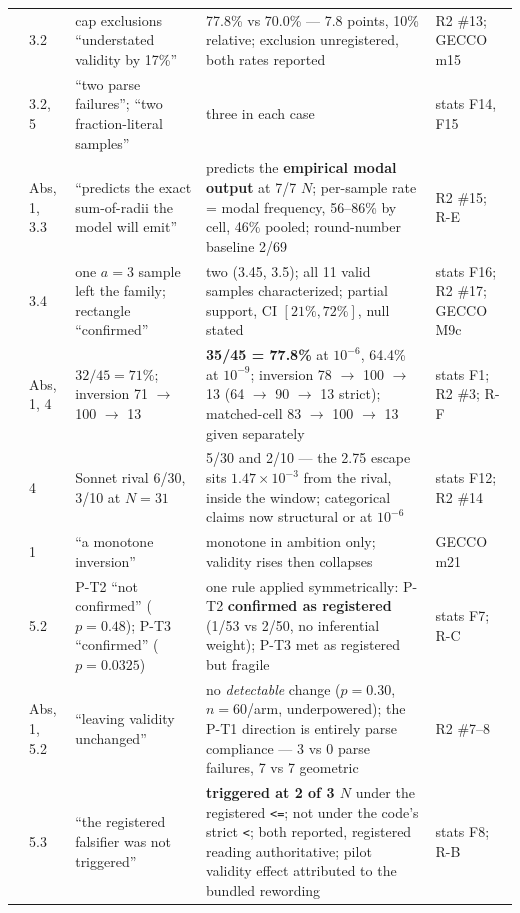 \documentclass[11pt]{article}
\begin{document}
\begin{longtable}{L{0.4cm}L{1.0cm}L{4.1cm}L{6.4cm}L{1.8cm}}
 & 3.2 & cap exclusions ``understated validity by 17\%'' & 77.8\% vs 70.0\% --- 7.8 points, 10\% relative; exclusion unregistered, both rates reported & R2 \#13; GECCO m15 \\
 & 3.2, 5 & ``two parse failures''; ``two fraction-literal samples'' & three in each case & stats F14, F15 \\
 & Abs, 1, 3.3 & ``predicts the exact sum-of-radii the model will emit'' & predicts the \textbf{empirical modal output} at 7/7 $N$; per-sample rate = modal frequency, 56--86\% by cell, 46\% pooled; round-number baseline 2/69 & R2 \#15; R-E \\
 & 3.4 & one $a = 3$ sample left the family; rectangle ``confirmed'' & two (3.45, 3.5); all 11 valid samples characterized; partial support, CI $[21\%, 72\%]$, null stated & stats F16; R2 \#17; GECCO M9c \\
 & Abs, 1, 4 & $32/45 = 71\%$; inversion 71 $\rightarrow$ 100 $\rightarrow$ 13 & \textbf{35/45 = 77.8\%} at $10^{-6}$, 64.4\% at $10^{-9}$; inversion 78 $\rightarrow$ 100 $\rightarrow$ 13 (64 $\rightarrow$ 90 $\rightarrow$ 13 strict); matched-cell 83 $\rightarrow$ 100 $\rightarrow$ 13 given separately & stats F1; R2 \#3; R-F \\
 & 4 & Sonnet rival 6/30, 3/10 at $N = 31$ & 5/30 and 2/10 --- the 2.75 escape sits $1.47\times10^{-3}$ from the rival, inside the window; categorical claims now structural or at $10^{-6}$ & stats F12; R2 \#14 \\
 & 1 & ``a monotone inversion'' & monotone in ambition only; validity rises then collapses & GECCO m21 \\
 & 5.2 & P-T2 ``not confirmed'' ($p = 0.48$); P-T3 ``confirmed'' ($p = 0.0325$) & one rule applied symmetrically: P-T2 \textbf{confirmed as registered} (1/53 vs 2/50, no inferential weight); P-T3 met as registered but fragile & stats F7; R-C \\
 & Abs, 1, 5.2 & ``leaving validity unchanged'' & no \textit{detectable} change ($p = 0.30$, $n = 60$/arm, underpowered); the P-T1 direction is entirely parse compliance --- 3 vs 0 parse failures, 7 vs 7 geometric & R2 \#7--8 \\
 & 5.3 & ``the registered falsifier was not triggered'' & \textbf{triggered at 2 of 3 $N$} under the registered \texttt{<=}; not under the code's strict \texttt{<}; both reported, registered reading authoritative; pilot validity effect attributed to the bundled rewording & stats F8; R-B \\

\end{longtable}
\end{document}
